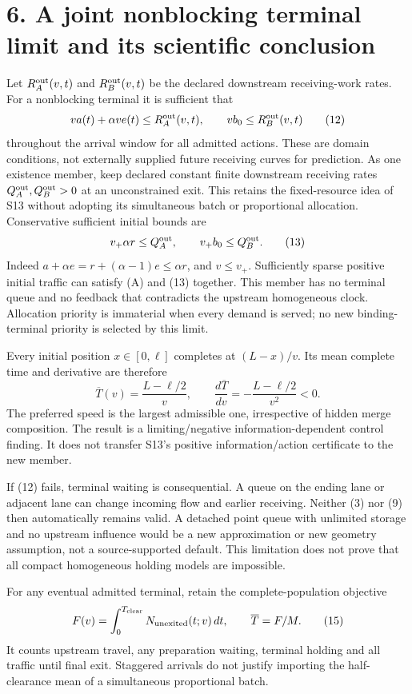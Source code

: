 \documentclass[11pt,a4paper]{article}
\begin{document}
\section*{6. A joint nonblocking terminal limit and its scientific conclusion}
Let $R_A^{\rm out}(v,t)$ and $R_B^{\rm out}(v,t)$ be the declared downstream
receiving-work rates. For a nonblocking terminal it is sufficient that
\[
 va(t)+\alpha ve(t)\leq R_A^{\rm out}(v,t),\qquad
 vb_0\leq R_B^{\rm out}(v,t)
 \tag{12}
\]
throughout the arrival window for all admitted actions. These are domain
conditions, not externally supplied future receiving curves for prediction.
As one existence member, keep declared constant finite downstream receiving
rates $Q_A^{\rm out},Q_B^{\rm out}>0$ at an unconstrained exit. This retains
the fixed-resource idea of S13 without adopting its simultaneous batch or
proportional allocation. Conservative sufficient initial bounds are
\[
 v_+\alpha r\leq Q_A^{\rm out},\qquad
 v_+b_0\leq Q_B^{\rm out}.
 \tag{13}
\]
Indeed $a+\alpha e=r+(\alpha-1)e\leq\alpha r$, and
$v\leq v_+$. Sufficiently sparse positive initial traffic can satisfy (A)
and (13) together. This member has no terminal queue and no feedback
that contradicts the upstream homogeneous clock. Allocation priority is
immaterial when every demand is served; no new binding-terminal priority is
selected by this limit.

Every initial position $x\in[0,\ell]$ completes at $(L-x)/v$. Its mean
complete time and derivative are therefore
\[
 \overline T(v)=\frac{L-\ell/2}{v},\qquad
 \frac{d\overline T}{dv}=-\frac{L-\ell/2}{v^2}<0.
 \tag{14}
\]
The preferred speed is the largest admissible one, irrespective of hidden
merge composition. The result is a limiting/negative information-dependent
control finding. It does not transfer S13's positive information/action
certificate to the new member.

If (12) fails, terminal waiting is consequential. A queue on the ending lane
or adjacent lane can change incoming flow and earlier receiving. Neither
(3) nor (9) then automatically remains valid. A detached point queue with
unlimited storage and no upstream influence would be a new approximation or
new geometry assumption, not a source-supported default. This limitation does
not prove that all compact homogeneous holding models are impossible.

For any eventual admitted terminal, retain the complete-population objective
\[
 F(v)=\int_0^{T_{\rm clear}} N_{\rm unexited}(t;v)\,dt,
 \qquad \overline T=F/M.
 \tag{15}
\]
It counts upstream travel, any preparation waiting, terminal holding and all
traffic until final exit. Staggered arrivals do not justify importing the
half-clearance mean of a simultaneous proportional batch.
\end{document}
